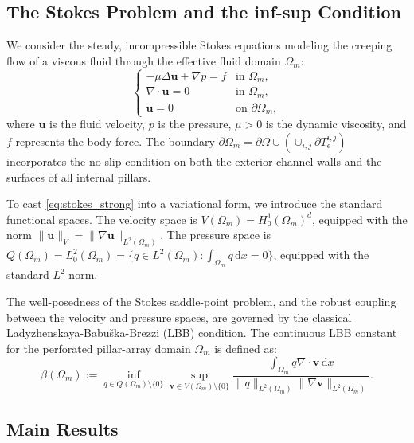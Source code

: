 \documentclass{elsarticle}
\begin{document}
\subsection{The Stokes Problem and the inf-sup Condition}

We consider the steady, incompressible Stokes equations modeling the creeping flow of a viscous fluid through the effective fluid domain $\Omega_m$:
\begin{equation} \label{eq:stokes_strong}
    \begin{cases}
        -\mu \Delta \mathbf{u} + \nabla p = f & \text{in } \Omega_m,          \\
        \nabla \cdot \mathbf{u} = 0           & \text{in } \Omega_m,          \\
        \mathbf{u} = 0                        & \text{on } \partial \Omega_m,
    \end{cases}
\end{equation}
where $\mathbf{u}$ is the fluid velocity, $p$ is the pressure, $\mu > 0$ is the dynamic viscosity, and $f$ represents the body force. The boundary $\partial \Omega_m = \partial \Omega \cup (\cup_{i,j} \partial T_{\epsilon}^{i,j})$ incorporates the no-slip condition on both the exterior channel walls and the surfaces of all internal pillars.

To cast \eqref{eq:stokes_strong} into a variational form, we introduce the standard functional spaces. The velocity space is $V(\Omega_m) = H_0^1(\Omega_m)^d$, equipped with the norm $\|\mathbf{u}\|_V = \|\nabla \mathbf{u}\|_{L^2(\Omega_m)}$. The pressure space is $Q(\Omega_m) = L_0^2(\Omega_m) = \{ q \in L^2(\Omega_m) : \int_{\Omega_m} q \, \mathrm{d}x = 0 \}$, equipped with the standard $L^2$-norm.

The well-posedness of the Stokes saddle-point problem, and the robust coupling between the velocity and pressure spaces, are governed by the classical Ladyzhenskaya-Babuška-Brezzi (LBB) condition. The continuous LBB constant for the perforated pillar-array domain $\Omega_m$ is defined as:
\begin{equation} \label{eq:infsup_def}
    \beta(\Omega_m) := \inf_{q \in Q(\Omega_m) \setminus \{0\}} \sup_{\mathbf{v} \in V(\Omega_m) \setminus \{0\}} \frac{\int_{\Omega_m} q \nabla \cdot \mathbf{v} \, \mathrm{d}x}{\|q\|_{L^2(\Omega_m)} \|\nabla \mathbf{v}\|_{L^2(\Omega_m)}}.
\end{equation}

\subsection{Main Results}
\end{document}
